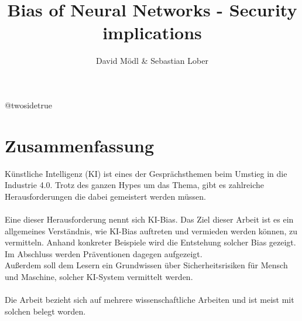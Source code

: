 \documentclass[12pt,oneside,a4paper,parskip]{scrbook}
\makeatletter
\def\BaAuthorStudyProgram{Informatik} %
\def\BaType{Seminararbeit} %
\def\BaTitle{Bias of Neural Networks - Security implications}
\def\BaSupervisorOne{Prof.\ Dr.\ A B}
\def\BaSupervisorTwo{Prof.\ Dr.\ C D}
\def\BaDeadline{\today}
\newcommand*{\forcetwosidetitle}[1][1]{%
 \begingroup
   \cleardoubleoddpage
   \KOMAoptions{titlepage=true}%
   \csname @twosidetrue\endcsname
   \maketitle[{#1}]
 \endgroup
}
\makeatother
\begin{document}


\frontmatter
\titlehead{%
  {Hochschule für angewandte Wissenschaften Würzburg-Schweinfurt\\
   Fakultät Informatik und Wirtschaftsinformatik}}
\subject{\BaType}
\title{\BaTitle\\[15mm]}
\author{David Mödl \& Sebastian Lober}
\forcetwosidetitle



\section*{Zusammenfassung}
Künstliche Intelligenz (KI) ist eines der Gesprächsthemen beim Umstieg in die Industrie 4.0. Trotz des ganzen Hypes um das Thema, gibt es zahlreiche Herausforderungen die dabei gemeistert werden müssen.
\\\\
Eine dieser Herausforderung nennt sich KI-Bias. Das Ziel dieser Arbeit ist es ein allgemeines Verständnis, wie KI-Bias auftreten und vermieden werden können, zu vermitteln. Anhand konkreter Beispiele wird die Entstehung solcher Bias gezeigt. Im Abschluss werden Präventionen dagegen aufgezeigt.\\
Außerdem soll dem Lesern ein Grundwissen über Sicherheitsrisiken für Mensch und Maschine, solcher KI-System vermittelt werden.
\\\\
Die Arbeit bezieht sich auf mehrere wissenschaftliche Arbeiten und ist meist mit solchen belegt worden.

\tableofcontents



\mainmatter
\end{document}
